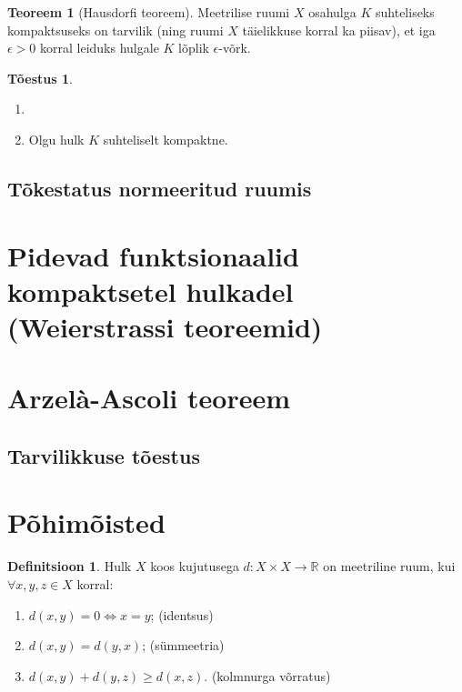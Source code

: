 \documentclass{article}[12pt]
\newcommand{\R}{\mathbb{R}}
\theoremstyle{definition}
\newtheorem{definition}{Definitsioon}[section]
\theoremstyle{definition}
\newtheorem{theorem}{Teoreem}[section]
\theoremstyle{definition}
\theoremstyle{break}
\newtheorem*{toestus}{Tõestus}
\begin{document}
\begin{theorem}[Hausdorfi teoreem]
	Meetrilise ruumi $X$ osahulga $K$ suhteliseks kompaktsuseks on tarvilik (ning ruumi $X$ täielikkuse korral ka piisav), et iga $\epsilon > 0$ korral leiduks hulgale $K$ lõplik $\epsilon$-võrk.
\end{theorem}
\begin{toestus}
	\begin{enumerate}
		\item[]
		\item Olgu hulk $K$ suhteliselt kompaktne.
	\end{enumerate}
\end{toestus}

\subsection{Tõkestatus normeeritud ruumis}

\section{Pidevad funktsionaalid kompaktsetel hulkadel (Weierstrassi teoreemid)}



\section{Arzelà-Ascoli teoreem}

\subsection{Tarvilikkuse tõestus}

\section{Põhimõisted}

\begin{definition}
	Hulk $X$ koos kujutusega $d:X\times X\rightarrow \R$ on meetriline ruum, kui $\forall x,y,z\in X$ korral:
	\begin{enumerate}
		\item $d(x,y)=0 \Leftrightarrow x=y$; \hfill (identsus)
		\item $d(x,y) = d(y,x)$; \hfill (sümmeetria)
		\item $d(x,y) + d(y,z) \geq d(x,z)$. \hfill (kolmnurga võrratus)
	\end{enumerate}
\end{definition}
\end{document}
